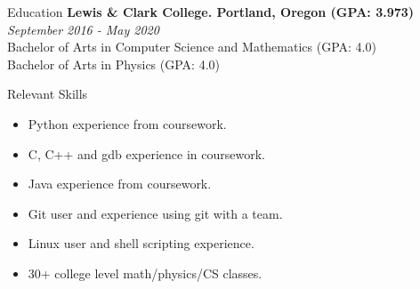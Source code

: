 \documentclass{resume}
\begin{document}
\begin{rSection}{Education}
    \textbf{Lewis \& Clark College. Portland, Oregon (GPA: 3.973)} \hfill \textit{September 2016 - May 2020}\\
    Bachelor of Arts in Computer Science and Mathematics (GPA: 4.0)\\
    Bachelor of Arts in Physics (GPA: 4.0)
\end{rSection}

\begin{rSection}{Relevant Skills}
    \vspace{-3.5mm}
	\begin{multicols}{2}
        \begin{itemize}
        		\item Python experience from coursework.
            \item C, C++ and gdb experience in coursework.
            \item Java experience from coursework.
            \item Git user and experience using git with a team.
            \item Linux user and shell scripting experience.
            \item 30+ college level math/physics/CS classes.
        \end{itemize}
    \end{multicols}
      \vspace{-4mm} 
\end{rSection}
\end{document}
